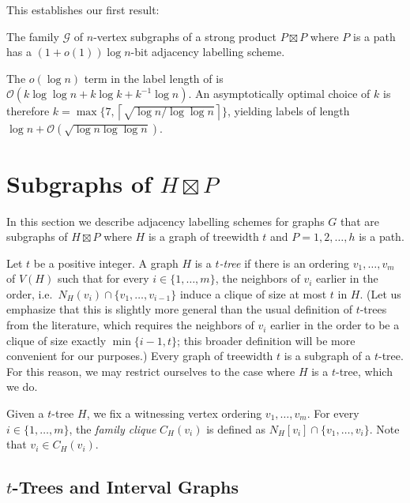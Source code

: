 \documentclass[kpfonts]{patmorin}
\newcommand{\Oh}{\mathcal{O}}
\begin{document}
This establishes our first result:

\begin{thm}
  The family $\mathcal{G}$ of $n$-vertex subgraphs of a strong product $P\boxtimes P$ where $P$ is a path has a $(1+o(1))\log n$-bit adjacency labelling scheme.
\end{thm}

\begin{rem}
  The $o(\log n)$ term in the label length of  is $\Oh(k\log\log n + k \log k + k^{-1}\log n)$.  An asymptotically optimal choice of $k$ is therefore $k=\max\{7,\left\lceil\sqrt{\log n / \log\log n}\right\rceil\}$, yielding labels of length $\log n + \Oh\left(\sqrt{\log n\log\log n}\right)$.
\end{rem}


\section{Subgraphs of $H\boxtimes P$}

In this section we describe adjacency labelling schemes for graphs $G$ that are subgraphs of $H\boxtimes P$ where $H$ is a graph of treewidth $t$ and $P=1,2,\ldots,h$ is a path.


Let $t$ be a positive integer.
A graph $H$ is a \emph{$t$-tree} if there is an ordering $v_1,\ldots,v_m$ of $V(H)$ such that 
for every $i\in\{1,\ldots,m\}$, the neighbors of $v_i$ earlier in the order, i.e.\ $N_H(v_i) \cap \{v_1,\ldots,v_{i-1}\}$ induce a clique of size at most $t$ in $H$. 
(Let us emphasize that this is slightly more general than the usual definition of $t$-trees from the literature, which requires the neighbors of $v_i$ earlier in the order to be a clique of size exactly $\min\{i-1, t\}$; this broader definition will be more convenient for our purposes.) 
Every graph of treewidth $t$ is a subgraph of a $t$-tree. 
For this reason, we may restrict ourselves to the case where $H$ is a $t$-tree, which we do.


Given a $t$-tree $H$, we fix a witnessing vertex ordering $v_1,\ldots,v_m$.
For every $i\in\{1,\ldots,m\}$, the \emph{family clique} $C_H(v_i)$ is defined as
$N_H[v_i]\cap \{v_1,\ldots,v_{i}\}$. 
Note that $v_i \in C_H(v_i)$.

\subsection{$t$-Trees and Interval Graphs}
\end{document}
